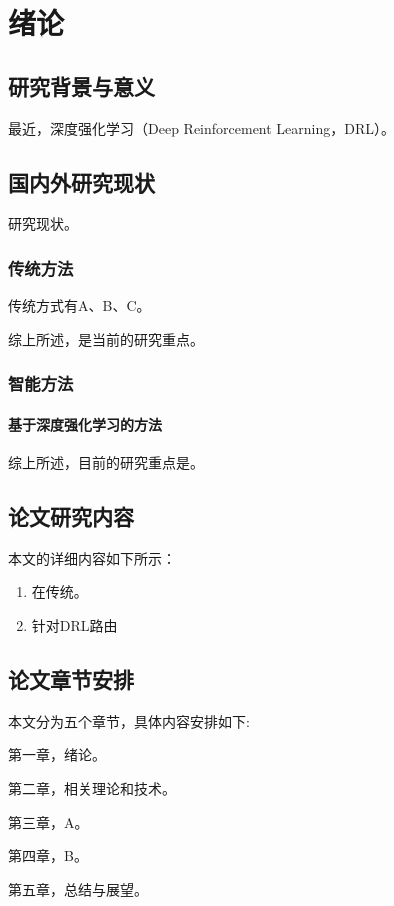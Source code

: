 
 \song  %

\chapter{绪论}

\section{研究背景与意义}
最近，深度强化学习（Deep Reinforcement Learning，DRL）。

\section{国内外研究现状}
研究现状。

\subsection{传统方法}
传统方式有A、B、C。

综上所述，是当前的研究重点。

\subsection{智能方法}

\subsubsection{基于深度强化学习的方法}
综上所述，目前的研究重点是。

\section{论文研究内容}
本文的详细内容如下所示：

\begin{enumerate}[nosep]
    \item 在传统。

    \item 针对DRL路由
\end{enumerate}

\section{论文章节安排}
本文分为五个章节，具体内容安排如下:

第一章，绪论。

第二章，相关理论和技术。

第三章，A。

第四章，B。

第五章，总结与展望。
